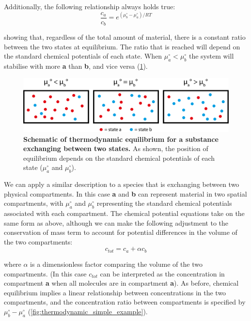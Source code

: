\documentclass[12pt]{"report"}
\newcommand{\mycaption}[2]{\caption[#1]{\textbf{#1.} #2}}
\begin{document}
Additionally, the following relationship always holds true:
\begin{equation}
\frac{c_a}{c_b} = e^{(\mu_b^{\circ} - \mu_a^{\circ})/RT}
\end{equation}

showing that, regardless of the total amount of material, there is a constant ratio between the two states at equilibrium. The ratio that is reached will depend on the standard chemical potentials of each state. When $\mu_a^{\circ} < \mu_b^{\circ}$ the system will stabilise with more \textbf{a} than \textbf{b}, and vice versa (\cref{fig:thermodynamic_simple_example2}).\\

\begin{figure}
\includegraphics[scale=0.9]{thermodynamic_simple_example2}
\centering
\mycaption{Schematic of thermodynamic equilibrium for a substance exchanging between two states}{
As shown, the position of equilibrium depends on the standard chemical potentials of each state ($\mu_a^{\circ}$ and $\mu_b^{\circ}$).}
\label{fig:thermodynamic_simple_example2}
\end{figure}

We can apply a similar description to a species that is exchanging between two physical compartments. In this case \textbf{a} and \textbf{b} can represent material in two spatial compartments, with $\mu_a^{\circ}$ and $\mu_b^{\circ}$ representing the standard chemical potentials associated with each compartment. The chemical potential equations take on the same form as above, although we can make the following adjustment to the conservation of mass term to account for potential differences in the volume of the two compartments:
\begin{equation}
c_{tot} = c_a + \alpha c_b
\end{equation}

where $\alpha$ is a dimensionless factor comparing the volume of the two compartments. (In this case $c_{tot}$ can be interpreted as the concentration in compartment \textbf{a} when all molecules are in compartment \textbf{a}). As before, chemical equilibrium implies a linear relationship between concentrations in the two compartments, and the concentration ratio between compartments is specified by $\mu_b^{\circ} - \mu_a^{\circ}$ (\cref{fig:thermodynamic_simple_example}).\\
\end{document}
